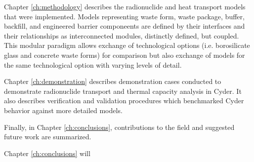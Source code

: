 
Chapter \ref{ch:methodology} describes the radionuclide and heat transport 
models that were implemented. Models representing waste form, waste package, 
buffer, backfill, and engineered barrier componeents are defined by their 
interfaces and their relationships as interconnected modules, distinctly 
defined, but coupled. This modular paradigm allows exchange  of technological 
options (i.e. borosilicate glass and concrete waste forms) for comparison but 
also exchange of models for the same technological option with varying levels 
of detail.  


Chapter \ref{ch:demonstration} describes demonstration cases conducted to 
demonstrate radionuclide transport and thermal capacity analysis in Cyder. It 
also describes verification and validation procedures which benchmarked Cyder 
behavior against more detailed models.


Finally, in Chapter \ref{ch:conclusions}, contributions to the field and 
suggested future work are summarized. 


Chapter \ref{ch:conclusions} will 


% 

